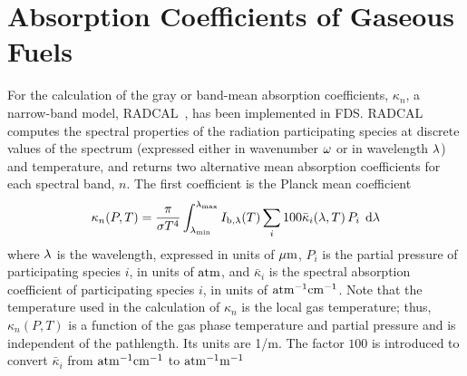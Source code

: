 

\chapter{Absorption Coefficients of Gaseous Fuels}
\label{absorption_coefficients}

For the calculation of the gray or band-mean absorption coefficients, $\kappa_n$, a narrow-band model, RADCAL~\cite{RadCal}, has been
implemented in FDS. RADCAL computes the spectral properties of the radiation participating species at discrete values of the spectrum (expressed either in wavenumber $\omega$ or in wavelength $\lambda$) and temperature,
and returns two alternative mean absorption coefficients for each spectral band, $n$. The first coefficient is the Planck mean coefficient \cite{Tien:1968}
\begin{equation}
\kappa_n(P,T) = \dfrac{\pi}{\sigma T^4}
\displaystyle\int_{\lambda_{\min}}^{\lambda_{\max}}{I_{\rm b,\lambda}(T)
\displaystyle\sum_i 100\bar{\kappa}_i(\lambda,T) \, P_i \; \,\mathrm{d} \lambda}
\end{equation}
where $\lambda$ is the wavelength, expressed in units of ${\rm \mu m}$, $P_i$ is the partial pressure of participating species $i$, in units of ${\rm atm}$, and $\bar{\kappa}_i$ is the spectral absorption coefficient of participating species $i$, in units of ${\rm atm^{-1}cm^{-1}}$. Note that the temperature used in the calculation of $\kappa_n$ is the local gas temperature; thus, $\kappa_n(P,T)$ is a function of the gas phase temperature and partial pressure and is independent of the pathlength. Its units are 1/m.
The factor $100$ is introduced to convert $\bar{\kappa}_i$ from ${\rm atm^{-1}cm^{-1}}$ to ${\rm atm^{-1}m^{-1}}$

